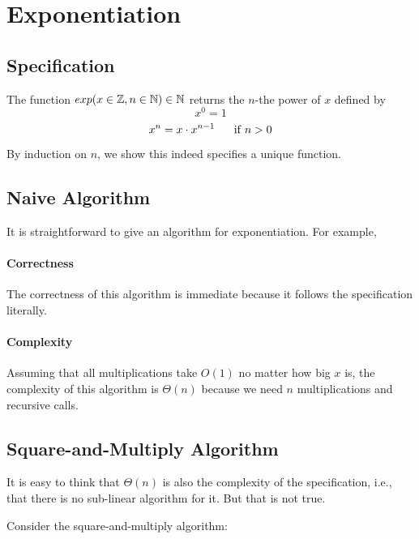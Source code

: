 \section{Exponentiation}\label{sec:ad:exp}

\subsection{Specification}\label{sec:ad:exp:spec}

The function $exp(x\in\mathbb{Z},n\in\mathbb{N})\in\mathbb{N}$ returns the $n$-the power of $x$ defined by
\[x^0=1\]
\[x^{n}=x\cdot x^{n-1} \hspace*{.5cm}\;\mathrm{if}\; n > 0\]

By induction on $n$, we show this indeed specifies a unique function.

\subsection{Naive Algorithm}\label{sec:ad:exp:naive}

It is straightforward to give an algorithm for exponentiation.
For example,
\begin{acode}
\end{acode}

\paragraph{Correctness}
The correctness of this algorithm is immediate because it follows the specification literally.

\paragraph{Complexity}
Assuming that all multiplications take $O(1)$ no matter how big $x$ is, the complexity of this algorithm is $\Theta(n)$ because we need $n$ multiplications and recursive calls.

\subsection{Square-and-Multiply Algorithm}\label{sec:ad:exp:sqmult}

It is easy to think that $\Theta(n)$ is also the complexity of the specification, i.e., that there is no sub-linear algorithm for it.
But that is not true.

Consider the square-and-multiply algorithm:
\begin{acode}
\end{acode}

